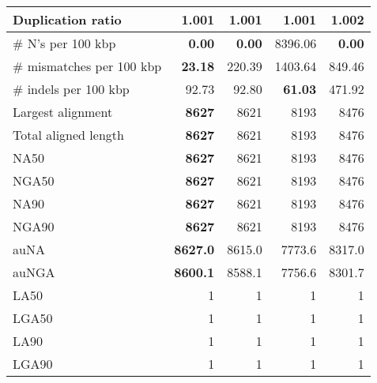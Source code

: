 \documentclass[12pt,a4paper]{article}
\begin{document}
\begin{table}[ht]
\begin{center}
\begin{tabular}{|l*{4}{|r}|}
Duplication ratio & {\bf 1.001} & {\bf 1.001} & {\bf 1.001} & 1.002 \\ \hline
\# N's per 100 kbp & {\bf 0.00} & {\bf 0.00} & 8396.06 & {\bf 0.00} \\ \hline
\# mismatches per 100 kbp & {\bf 23.18} & 220.39 & 1403.64 & 849.46 \\ \hline
\# indels per 100 kbp & 92.73 & 92.80 & {\bf 61.03} & 471.92 \\ \hline
Largest alignment & {\bf 8627} & 8621 & 8193 & 8476 \\ \hline
Total aligned length & {\bf 8627} & 8621 & 8193 & 8476 \\ \hline
NA50 & {\bf 8627} & 8621 & 8193 & 8476 \\ \hline
NGA50 & {\bf 8627} & 8621 & 8193 & 8476 \\ \hline
NA90 & {\bf 8627} & 8621 & 8193 & 8476 \\ \hline
NGA90 & {\bf 8627} & 8621 & 8193 & 8476 \\ \hline
auNA & {\bf 8627.0} & 8615.0 & 7773.6 & 8317.0 \\ \hline
auNGA & {\bf 8600.1} & 8588.1 & 7756.6 & 8301.7 \\ \hline
LA50 & 1 & 1 & 1 & 1 \\ \hline
LGA50 & 1 & 1 & 1 & 1 \\ \hline
LA90 & 1 & 1 & 1 & 1 \\ \hline
LGA90 & 1 & 1 & 1 & 1 \\ \hline
\end{tabular}
\end{center}
\end{table}
\end{document}
